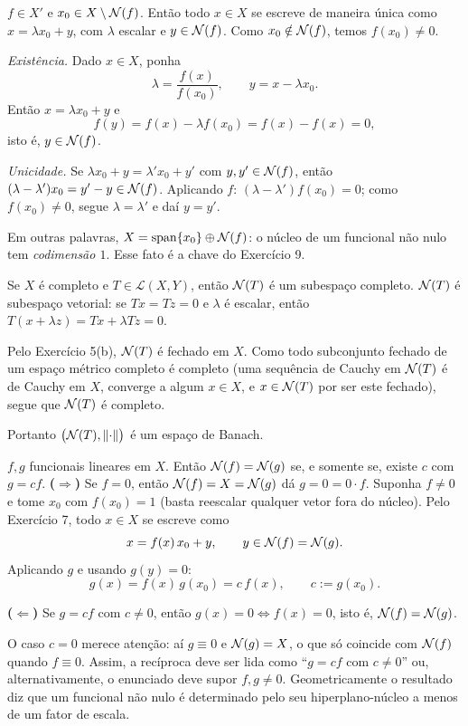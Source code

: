 \begin{exercicio}{$f\in X'$ e $x_0\in X\setminus\mathcal{N}(f)$. Então todo $x\in X$ se escreve de maneira única como $x=\lambda x_0+y$, com $\lambda$ escalar e $y\in\mathcal{N}(f)$.}
\sol
Como $x_0\notin\mathcal{N}(f)$, temos $f(x_0)\neq0$.

\emph{Existência.} Dado $x\in X$, ponha
\[ \lambda=\frac{f(x)}{f(x_0)},\qquad y=x-\lambda x_0. \]
Então $x=\lambda x_0+y$ e
\[ f(y)=f(x)-\lambda f(x_0)=f(x)-f(x)=0, \]
isto é, $y\in\mathcal{N}(f)$.

\emph{Unicidade.} Se $\lambda x_0+y=\lambda'x_0+y'$ com $y,y'\in\mathcal{N}(f)$, então $(\lambda-\lambda')x_0=y'-y\in\mathcal{N}(f)$. Aplicando $f$: $(\lambda-\lambda')f(x_0)=0$; como $f(x_0)\neq0$, segue $\lambda=\lambda'$ e daí $y=y'$.

Em outras palavras, $X=\operatorname{span}\{x_0\}\oplus\mathcal{N}(f)$: o núcleo de um funcional não nulo tem \emph{codimensão $1$}. Esse fato é a chave do Exercício 9.
\end{exercicio}
\begin{exercicio}{Se $X$ é completo e $T\in\mathcal{L}(X,Y)$, então $\mathcal{N}(T)$ é um subespaço completo.}
\sol
$\mathcal{N}(T)$ é subespaço vetorial: se $Tx=Tz=0$ e $\lambda$ é escalar, então $T(x+\lambda z)=Tx+\lambda Tz=0$.

Pelo Exercício 5(b), $\mathcal{N}(T)$ é fechado em $X$. Como todo subconjunto fechado de um espaço métrico completo é completo (uma sequência de Cauchy em $\mathcal{N}(T)$ é de Cauchy em $X$, converge a algum $x\in X$, e $x\in\mathcal{N}(T)$ por ser este fechado), segue que $\mathcal{N}(T)$ é completo.

Portanto $\bigl(\mathcal{N}(T),\lVert\cdot\rVert\bigr)$ é um espaço de Banach.
\end{exercicio}

\begin{exercicio}{$f,g$ funcionais lineares em $X$. Então $\mathcal{N}(f)=\mathcal{N}(g)$ se, e somente se, existe $c$ com $g=cf$.}
\sol
\textbf{($\Rightarrow$)} Se $f=0$, então $\mathcal{N}(f)=X=\mathcal{N}(g)$ dá $g=0=0\cdot f$. Suponha $f\neq0$ e tome $x_0$ com $f(x_0)=1$ (basta reescalar qualquer vetor fora do núcleo). Pelo Exercício 7, todo $x\in X$ se escreve como
\[ x=f(x)\,x_0+y,\qquad y\in\mathcal{N}(f)=\mathcal{N}(g). \]
Aplicando $g$ e usando $g(y)=0$:
\[ g(x)=f(x)\,g(x_0)=c\,f(x),\qquad c:=g(x_0). \]

\textbf{($\Leftarrow$)} Se $g=cf$ com $c\neq0$, então $g(x)=0\iff f(x)=0$, isto é, $\mathcal{N}(f)=\mathcal{N}(g)$.

\begin{obs}
O caso $c=0$ merece atenção: aí $g\equiv0$ e $\mathcal{N}(g)=X$, o que só coincide com $\mathcal{N}(f)$ quando $f\equiv0$. Assim, a recíproca deve ser lida como ``$g=cf$ com $c\neq0$'' ou, alternativamente, o enunciado deve supor $f,g\neq0$. Geometricamente o resultado diz que um funcional não nulo é determinado pelo seu hiperplano-núcleo a menos de um fator de escala.
\end{obs}
\end{exercicio}

